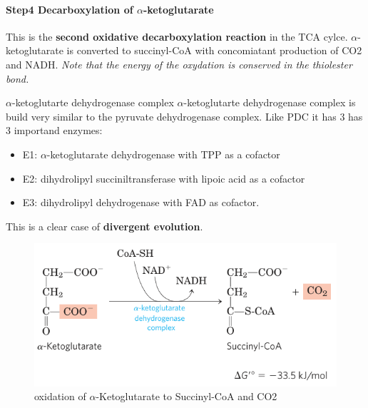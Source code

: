 \documentclass[../main.tex]{subfiles}
\begin{document}
\paragraph{Step4 Decarboxylation of $\alpha$-ketoglutarate}
This is the \textbf{second oxidative decarboxylation reaction} in the TCA cylce. $\alpha$-ketoglutarate is converted to succinyl-CoA with concomiatant production of CO2 and NADH. \textit{Note that the energy of the oxydation is conserved in the thiolester bond.}

\begin{RemarkWithTitel}{$\alpha$-ketoglutarte dehydrogenase complex}
	$\alpha$-ketoglutarte dehydrogenase complex is build very similar to the pyruvate dehydrogenase complex. Like PDC it has 3 has 3 importand enzymes: 
	\begin{itemize}
		\item E1: $\alpha$-ketoglutarate dehydrogenase with TPP as a cofactor
		\item E2: dihydrolipyl succiniltransferase with lipoic acid as a cofactor
		\item E3: dihydrolipyl dehydrogenase with FAD as cofactor. 
	\end{itemize}
	\noindent This is a clear case of \textbf{divergent evolution}. 
\end{RemarkWithTitel}

\begin{figure}[H]
	\centering
	\includegraphics[height = 4 cm]{TCAS4}
	\caption{oxidation of $\alpha$-Ketoglutarate to Succinyl-CoA and CO2}
\end{figure}
\end{document}
